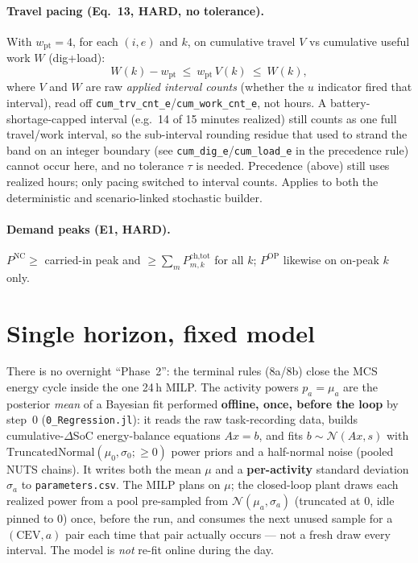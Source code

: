 \documentclass[11pt]{article}
\begin{document}
\paragraph{Travel pacing (Eq.\ 13, HARD, no tolerance).}
With $w_{\text{pt}}=4$, for each $(i,e)$ and $k$, on cumulative travel $V$ vs cumulative
useful work $W$ (dig+load):
\begin{equation}
W(k)-w_{\text{pt}}\ \le\ w_{\text{pt}}\,V(k)\ \le\ W(k),
\end{equation}
where $V$ and $W$ are raw \emph{applied interval counts} (whether the $u$ indicator fired that
interval), read off \texttt{cum\_trv\_cnt\_e}/\texttt{cum\_work\_cnt\_e}, not hours. A battery-
shortage-capped interval (e.g.\ 14 of 15 minutes realized) still counts as one full travel/work
interval, so the sub-interval rounding residue that used to strand the band on an integer boundary
(see \texttt{cum\_dig\_e}/\texttt{cum\_load\_e} in the precedence rule) cannot occur here, and no
tolerance $\tau$ is needed. Precedence (above) still uses realized hours; only pacing switched to
interval counts. Applies to both the deterministic and scenario-linked stochastic builder.

\paragraph{Demand peaks (E1, HARD).}
$P^{\text{NC}}\ge$ carried-in peak and $\ge\sum_m P^{\text{ch,tot}}_{m,k}$ for all $k$;
$P^{\text{OP}}$ likewise on on-peak $k$ only.

\section{Single horizon, fixed model}
There is no overnight ``Phase~2'': the terminal rules (8a/8b) close the MCS energy cycle inside
the one 24\,h MILP. The activity powers $p_a=\mu_a$ are the posterior \emph{mean} of a Bayesian
fit performed \textbf{offline, once, before the loop} by step~0 (\texttt{0\_Regression.jl}): it
reads the raw task-recording data, builds cumulative-$\Delta$SoC energy-balance equations
$A x = b$, and fits $b\sim\mathcal{N}(Ax,s)$ with $\mathrm{TruncatedNormal}(\mu_0,\sigma_0;\ge0)$
power priors and a half-normal noise (pooled NUTS chains). It writes both the mean $\mu$ and a
\textbf{per-activity} standard deviation $\sigma_a$ to \texttt{parameters.csv}. The MILP plans on
$\mu$; the closed-loop plant draws each realized power from a pool pre-sampled from
$\mathcal{N}(\mu_a,\sigma_a)$ (truncated at $0$, idle pinned to $0$) once, before the run, and
consumes the next unused sample for a $(\text{CEV},a)$ pair each time that pair actually occurs
--- not a fresh draw every interval. The model is \emph{not} re-fit online during the day.
\end{document}
